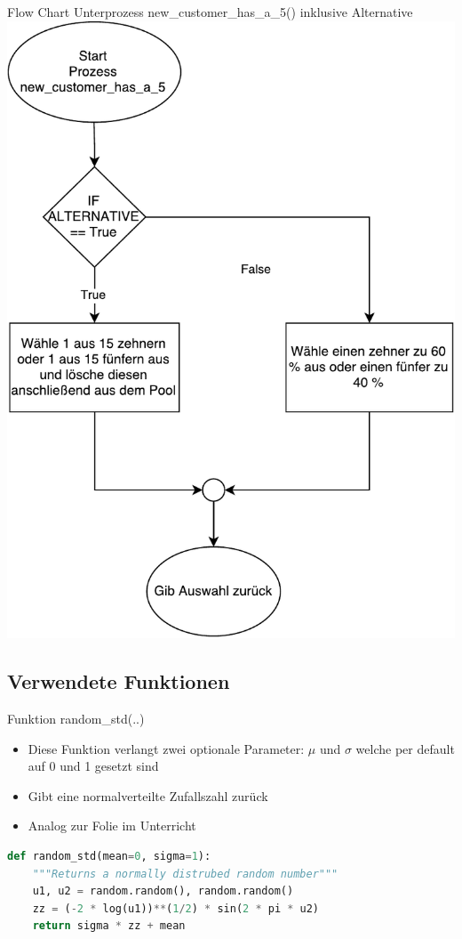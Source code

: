 \begin{frame}{Flow Chart Unterprozess new\_customer\_has\_a\_5() inklusive Alternative}
	\centering
  	\includegraphics[scale=0.3]{BSP18_Flow_Chart_3.pdf}
\end{frame}


\subsection{Verwendete Funktionen}
%
%

 \begin{frame}[fragile]{Funktion random\_std(..)}
  \begin{itemize}
    \item Diese Funktion verlangt zwei optionale Parameter: $\mu$ und $\sigma$ welche per default auf 0 und 1 gesetzt sind
    \item Gibt eine normalverteilte Zufallszahl zurück
    \item Analog zur Folie im Unterricht
  \end{itemize}
  \begin{lstlisting}[language=python]
def random_std(mean=0, sigma=1):
    """Returns a normally distrubed random number"""
    u1, u2 = random.random(), random.random()
    zz = (-2 * log(u1))**(1/2) * sin(2 * pi * u2)
    return sigma * zz + mean
\end{lstlisting}
\logopythonbottom
\end{frame}	



